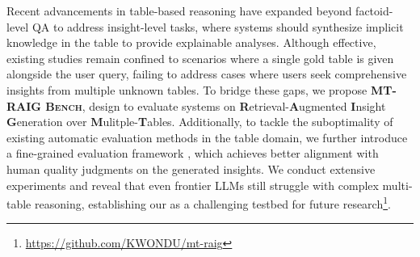 Recent advancements in table-based reasoning have expanded beyond factoid-level QA to address insight-level tasks, where systems should synthesize implicit knowledge in the table to provide explainable analyses. Although effective, existing studies remain confined to scenarios where a single gold table is given alongside the user query, failing to address cases where users seek comprehensive insights from multiple unknown tables. To bridge these gaps, we propose \textbf{\textsc{MT-RAIG Bench}}, design to evaluate systems on \textbf{R}etrieval-\textbf{A}ugmented \textbf{I}nsight \textbf{G}eneration over \textbf{M}ulitple-\textbf{T}ables.
Additionally, to tackle the suboptimality of existing automatic evaluation methods in the table domain, we further introduce a fine-grained evaluation framework \textbf{\eval}, which achieves better alignment with human quality judgments on the generated insights. 
We conduct extensive experiments and 
reveal that even frontier LLMs still struggle with complex multi-table reasoning, establishing our \bench as a challenging testbed for future research\footnote{\url{https://github.com/KWONDU/mt-raig}}.